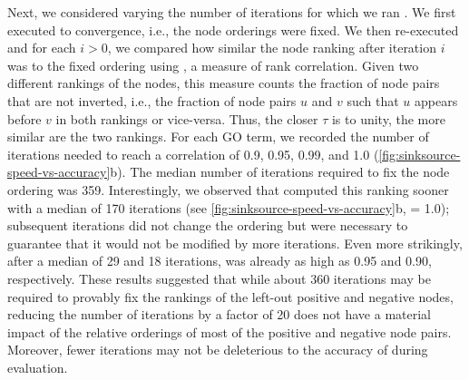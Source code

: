 Next, we considered varying the number of iterations for which we ran \sinksource. We first executed \sinksource to convergence, i.e., the node orderings were fixed.
We then re-executed \sinksource and for each $i > 0$, we compared how similar the node ranking after iteration $i$ was to the fixed ordering using \ktau, a measure of rank correlation. Given two different rankings of the nodes, this measure counts the fraction of node pairs that are not inverted, i.e., the fraction of node pairs $u$ and $v$ such that $u$ appears before $v$ in both rankings or vice-versa. Thus, the closer $\tau$ is to unity, the more similar are the two rankings. For each GO term, we recorded the number of iterations needed to reach a correlation of 0.9, 0.95, 0.99, and 1.0 (\cref{fig:sinksource-speed-vs-accuracy}b). 
The median number of iterations required to fix the node ordering was 359. Interestingly, we observed that \sinksource computed this ranking sooner with a median of 170 iterations (see \cref{fig:sinksource-speed-vs-accuracy}b, \ktau = 1.0); subsequent iterations did not change the ordering but were necessary to guarantee that it would not be modified by more iterations. 
Even more strikingly, after a median of 29 and 18 iterations, \ktau was already as high as 0.95 and 0.90, respectively.
These results suggested that while about 360 iterations may be required to provably fix the rankings of the left-out positive and negative nodes, reducing the number of iterations by a factor of 20 does not have a material impact of the relative orderings of most of the positive and negative node pairs. Moreover, fewer iterations may not be deleterious to the accuracy of \sinksource during evaluation.

